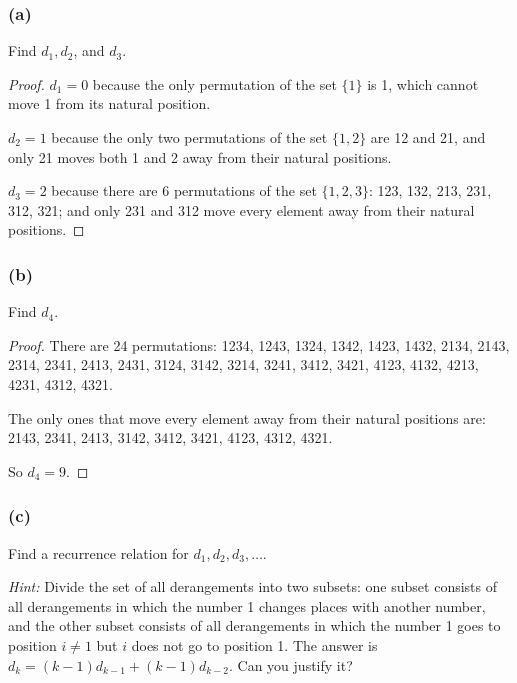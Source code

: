\documentclass[14pt]{extarticle}
\begin{document}
\subsubsection{(a)}
Find \(d_1, d_2\), and \(d_3\).

\begin{proof}
     \(d_1 = 0\) because the only permutation of the set \(\{1\}\) is 1, which cannot move 1 from its natural position.

     \(d_2 = 1\) because the only two permutations of the set \(\{1,2\}\) are 12 and 21, and only 21 moves both 1 and 2
     away from their natural positions.

     \(d_3 = 2\) because there are 6 permutations of the set \(\{1,2,3\}\): 123, 132, 213, 231, 312, 321; and only 231
     and 312 move every element away from their natural positions.
\end{proof}

\subsubsection{(b)}
Find \(d_4\).

\begin{proof}
     There are 24 permutations: 1234, 1243, 1324, 1342, 1423, 1432, 2134, 2143, 2314, 2341, 2413, 2431, 3124, 3142, 3214,
     3241, 3412, 3421, 4123, 4132, 4213, 4231, 4312, 4321.

     The only ones that move every element away from their natural positions are: 2143, 2341, 2413, 3142, 3412, 3421,
     4123, 4312, 4321.

     So \(d_4 = 9\).
\end{proof}

\subsubsection{(c)}
Find a recurrence relation for \(d_1, d_2, d_3, \ldots\).

     {\it Hint:} Divide the set of all derangements into two subsets: one subset consists of all derangements in which
the number 1 changes places with another number, and the other subset consists of all derangements in which the
number 1 goes to position \(i \neq 1\) but $i$ does not go to position 1. The answer is \(d_k = (k - 1)d_{k-1} + (k-1)
d_{k-2}\). Can you justify it?
\end{document}
